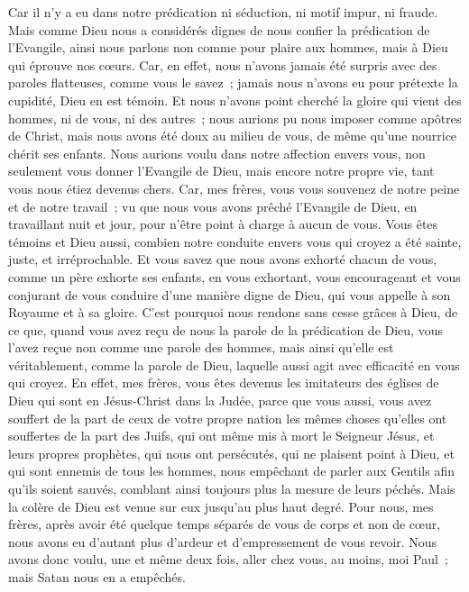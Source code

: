 \begin{multicols}{2}
Car il n'y a eu dans notre prédication ni séduction, ni motif impur, ni fraude.
Mais comme Dieu nous a considérés dignes de nous confier la prédication de l'Evangile, ainsi nous parlons non comme pour plaire aux hommes, mais à Dieu qui éprouve nos cœurs.
Car, en effet, nous n'avons jamais été surpris avec des paroles flatteuses, comme vous le savez~; jamais nous n'avons eu pour prétexte la cupidité, Dieu en est témoin.
Et nous n'avons point cherché la gloire qui vient des hommes, ni de vous, ni des autres~; nous aurions pu nous imposer comme apôtres de Christ,
mais nous avons été doux au milieu de vous, de même qu'une nourrice chérit ses enfants.
Nous aurions voulu dans notre affection envers vous, non seulement vous donner l'Evangile de Dieu, mais encore notre propre vie, tant vous nous étiez devenus chers.
Car, mes frères, vous vous souvenez de notre peine et de notre travail~; vu que nous vous avons prêché l'Evangile de Dieu, en travaillant nuit et jour, pour n'être point à charge à aucun de vous.
Vous êtes témoins et Dieu aussi, combien notre conduite envers vous qui croyez a été sainte, juste, et irréprochable.
Et vous savez que nous avons exhorté chacun de vous, comme un père exhorte ses enfants,
en vous exhortant, vous encourageant et vous conjurant de vous conduire d'une manière digne de Dieu, qui vous appelle à son Royaume et à sa gloire.
C'est pourquoi nous rendons sans cesse grâces à Dieu, de ce que, quand vous avez reçu de nous la parole de la prédication de Dieu, vous l'avez reçue non comme une parole des hommes, mais ainsi qu'elle est véritablement, comme la parole de Dieu, laquelle aussi agit avec efficacité en vous qui croyez.
En effet, mes frères, vous êtes devenus les imitateurs des églises de Dieu qui sont en Jésus-Christ dans la Judée, parce que vous aussi, vous avez souffert de la part de ceux de votre propre nation les mêmes choses qu'elles ont souffertes de la part des Juifs,
qui ont même mis à mort le Seigneur Jésus, et leurs propres prophètes, qui nous ont persécutés, qui ne plaisent point à Dieu, et qui sont ennemis de tous les hommes,
nous empêchant de parler aux Gentils afin qu'ils soient sauvés, comblant ainsi toujours plus la mesure de leurs péchés. Mais la colère de Dieu est venue sur eux jusqu'au plus haut degré.
Pour nous, mes frères, après avoir été quelque temps séparés de vous de corps et non de cœur, nous avons eu d'autant plus d'ardeur et d'empressement de vous revoir.
Nous avons donc voulu, une et même deux fois, aller chez vous, au moins, moi Paul~; mais Satan nous en a empêchés.

\end{multicols}
